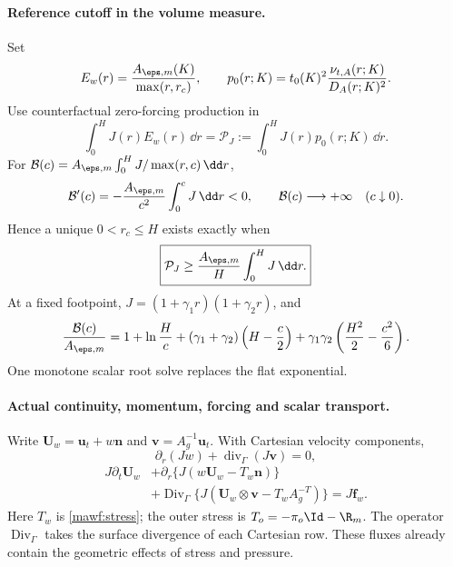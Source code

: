 \paragraph{Reference cutoff in the volume measure.}
Set
\begin{equation}
 E_w(r)=\frac{A_{\eps,m}(K)}{\max(r,r_c)},\qquad
 p_0(r;K)=t_0(K)^2\frac{\nu_{t,A}(r;K)}{D_A(r;K)^2}.
\end{equation}
Use counterfactual zero-forcing production in
\begin{equation}
 \boxed{\int_0^H J(r)E_w(r)\,\dd r
        =\mathcal P_J:=\int_0^H J(r)p_0(r;K)\,\dd r.}
 \label{mawf:metric-budget}
\end{equation}
For \(\mathcal B(c)=A_{\eps,m}\int_0^H J/\max(r,c)\,\dd r\),
\[
 \mathcal B'(c)=-\frac{A_{\eps,m}}{c^2}\int_0^cJ\,\dd r<0,
 \qquad \mathcal B(c)\longrightarrow+\infty\quad(c\downarrow0).
\]
Hence a unique \(0<r_c\le H\) exists exactly when
\begin{equation}
 \boxed{\mathcal P_J\ge
        \frac{A_{\eps,m}}H\int_0^H J\,\dd r.}
 \label{mawf:metric-gate}
\end{equation}
At a fixed footpoint, \(J=(1+\gamma_1r)(1+\gamma_2r)\), and
\begin{equation}
 \frac{\mathcal B(c)}{A_{\eps,m}}
 =1+\ln\frac Hc
 +(\gamma_1+\gamma_2)\left(H-\frac c2\right)
 +\gamma_1\gamma_2\left(\frac{H^2}{2}-\frac{c^2}{6}\right).
 \label{mawf:metric-explicit}
\end{equation}
One monotone scalar root solve replaces the flat exponential.

\paragraph{Actual continuity, momentum, forcing and scalar transport.}
Write \(\bm U_w=\bm u_t+w\bm n\) and
\(\bm v=A_g^{-1}\bm u_t\). With Cartesian velocity components,
\begin{equation}
 \partial_r(Jw)+\operatorname{div}_\Gamma(J\bm v)=0,
 \label{mawf:continuity}
\end{equation}
\begin{equation}
 \begin{split}
 J\partial_t\bm U_w
 &+\partial_r\{J(w\bm U_w-T_w\bm n)\}\\
 &+\operatorname{Div}_\Gamma
   \{J(\bm U_w\otimes\bm v-T_wA_g^{-T})\}=J\bm f_w .
 \end{split}
 \label{mawf:curved-momentum}
\end{equation}
Here \(T_w\) is \cref{mawf:stress};
the outer stress is \(T_o=-\pi_o\Id-\R_m\).
The operator \(\operatorname{Div}_\Gamma\) takes the surface
divergence of each Cartesian row. These fluxes already contain
the geometric effects of stress and pressure.

